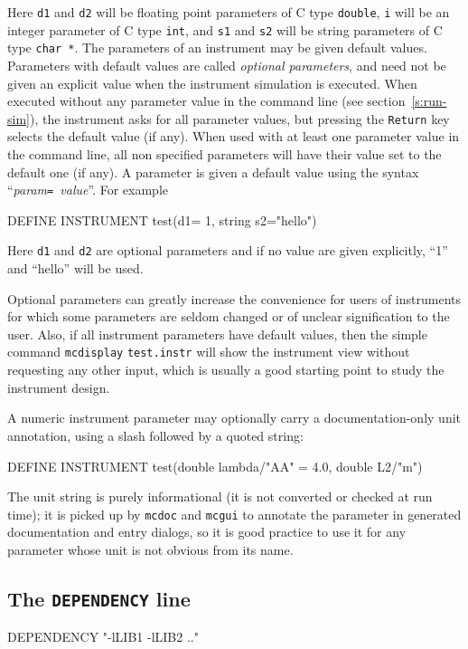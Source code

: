 Here \verb+d1+ and \verb+d2+ will be floating point parameters of C type
\verb+double+, \verb+i+ will be an integer parameter of C type \verb+int+, and
\verb+s1+ and \verb+s2+ will be string parameters of C type \verb+char *+.
 The parameters of an instrument may
be given default values. Parameters with default values are called
\emph{optional parameters}, and need not be given an explicit value when the
instrument simulation is executed. When executed without any parameter value in
the command line (see section~\ref{s:run-sim}), the instrument asks for all
parameter values, but pressing the \verb+Return+ key selects the default value
(if any). When used with at least one parameter value in the command line, all
non specified parameters will have their value set to the default one (if
any). A parameter is given a default value using the syntax
``\textit{param}\texttt{= }\textit{value}''.  For example
\begin{mcstas}
DEFINE INSTRUMENT test(d1= 1, string s2="hello")
\end{mcstas}
Here \verb+d1+ and \verb+d2+ are optional parameters and if no
value are given explicitly, ``1'' and ``hello'' will be used.

Optional parameters can greatly increase the convenience for users of
instruments for which some parameters are seldom changed or of unclear
signification to the user. Also, if all instrument parameters have default
values, then the simple command \verb+mcdisplay+ \verb+test.instr+ will show the
instrument view without requesting any other input, which is usually a good
starting point to study the instrument design.

A numeric instrument parameter may optionally carry a documentation-only unit
annotation, using a slash followed by a quoted string:
\begin{mcstas}
DEFINE INSTRUMENT test(double lambda/"AA" = 4.0, double L2/"m")
\end{mcstas}
The unit string is purely informational (it is not converted or checked at
run time); it is picked up by \verb+mcdoc+ and \verb+mcgui+ to annotate the
parameter in generated documentation and entry dialogs, so it is good
practice to use it for any parameter whose unit is not obvious from its name.

\subsection{The \texttt{DEPENDENCY} line}
\label{s:dependency}
\begin{mcstas}
DEPENDENCY "-lLIB1 -lLIB2 .."
\end{mcstas}

